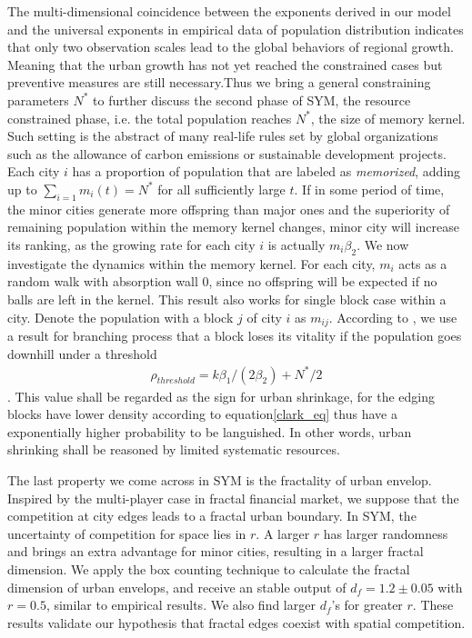 \documentclass[reprint,unsortedaddress,amsmath,amssymb,floatfix,aps,prl,showkeys]{revtex4-2}
\begin{document}
The multi-dimensional coincidence between the exponents derived in our model and the universal exponents in empirical data of population distribution indicates that only two observation scales lead to the global behaviors of regional growth. Meaning that the urban growth has not yet reached the constrained cases but preventive measures are still necessary.Thus we bring a general constraining parameters $N^*$ to further discuss the second phase of SYM, the resource constrained phase, i.e. the total population reaches $N^*$, the size of memory kernel. Such setting is the abstract of many real-life rules set by global organizations such as the allowance of carbon emissions or sustainable development projects. Each city $i$ has a proportion of population that are labeled as \emph{memorized}, adding up to $\sum_{i=1} m_i(t) = N^*$ for all sufficiently large $t$. If in some period of time, the minor cities generate more offspring than major ones and the superiority of remaining population within the memory kernel changes, minor city will increase its ranking, as the growing rate for each city $i$ is actually $m_i\beta_2$. We now investigate the dynamics within the memory kernel. For each city, $m_i$ acts as a random walk with absorption wall $0$, since no offspring will be expected if no balls are left in the kernel. This result also works for single block case within a city. Denote the population with a block $j$ of city $i$ as $m_{ij}$. According to \cite{durrett1999essentials}, we use a result for branching process that a block loses its vitality if the population goes downhill under a threshold \begin{align}\rho_{threshold} = k\beta_1/(2\beta_2)+N^*/2\end{align}. This value shall be regarded as the sign for urban shrinkage, for the edging blocks have lower density according to equation\ref{clark_eq} thus have a exponentially higher probability to be languished. In other words, urban shrinking shall be reasoned by limited systematic resources.

The last property we come across in SYM is the fractality of urban envelop. Inspired by the multi-player case in fractal financial market, we suppose that the competition at city edges leads to a fractal urban boundary. In SYM, the uncertainty of competition for space lies in $r$. A larger $r$ has larger randomness and brings an extra advantage for minor cities, resulting in a larger fractal dimension. We apply the box counting technique to calculate the fractal dimension of urban envelops, and receive an stable output of $d_f = 1.2\pm 0.05$ with $r = 0.5$, similar to empirical results\cite{batty1992form}. We also find larger $d_f$'s for greater $r$. These results validate our hypothesis that fractal edges coexist with spatial competition. 
\end{document}
